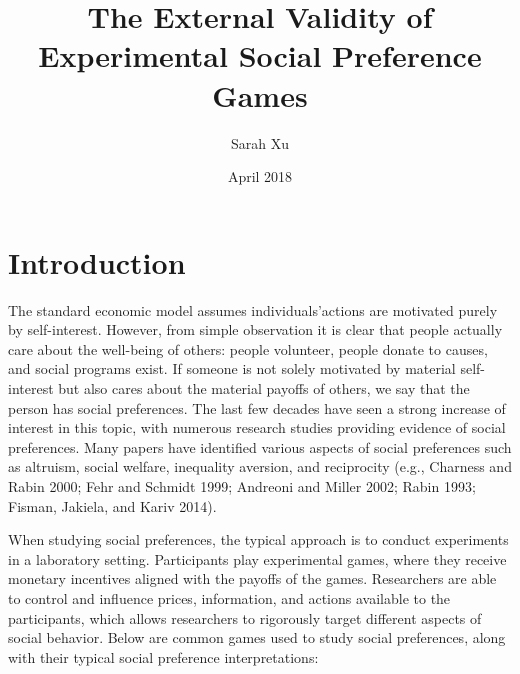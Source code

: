 \documentclass[12pt]{article}
\title{The External Validity of Experimental Social Preference Games}
\author{Sarah Xu}
\date{April 2018}
\begin{document}
\maketitle

\section{Introduction}

The standard economic model assumes individuals\rq actions are motivated purely by self-interest. However, from simple observation it is clear that people actually care about the well-being of others: people volunteer, people donate to causes, and social programs exist. If someone is not solely motivated by material self-interest but also cares about the material payoffs of others, we say that the person has social preferences. The last few decades have seen a strong increase of interest in this topic, with numerous research studies providing evidence of social preferences. Many papers have identified various aspects of social preferences such as altruism, social welfare, inequality aversion, and reciprocity (e.g., Charness and Rabin 2000; Fehr and Schmidt 1999; Andreoni and Miller 2002; Rabin 1993; Fisman, Jakiela, and Kariv 2014). 
 
When studying social preferences, the typical approach is to conduct experiments in a laboratory setting. Participants play experimental games, where they receive monetary incentives aligned with the payoffs of the games. Researchers are able to control and influence prices, information, and actions available to the participants, which allows researchers to rigorously target different aspects of social behavior. Below are common games used to study social preferences, along with their typical social preference interpretations: 
\end{document}
